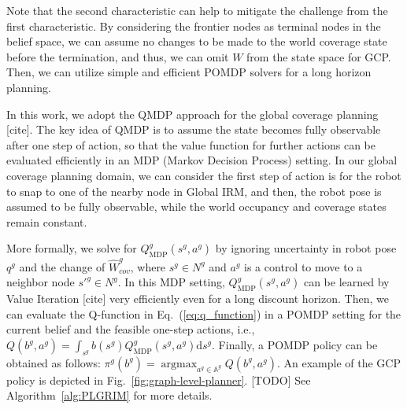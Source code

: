 \documentclass[letterpaper]{article} %
\newcommand{\phdone}[1]{} %
\newcommand{\argmax}{\mathop{\mathrm{argmax}}}
\begin{document}
%
%
\phdone{GCP Problem Approximation}
Note that the second characteristic can help to mitigate the challenge from the first characteristic.
By considering the frontier nodes as terminal nodes in the belief space, we can assume no changes to be made to the world coverage state before the termination, and thus, we can omit $W$ from the state space for GCP.
Then, we can utilize simple and efficient POMDP solvers for a long horizon planning.
%
%


\phdone{POMDP Solver for GCP}
In this work, we adopt the QMDP approach for the global coverage planning [cite].
The key idea of QMDP is to assume the state becomes fully observable after one step of action, so that the value function for further actions can be evaluated efficiently in an MDP (Markov Decision Process) setting.
In our global coverage planning domain, we can consider the first step of action is for the robot to snap to one of the nearby node in Global IRM, and then, the robot pose is assumed to be fully observable, while the world occupancy and coverage states remain constant.

%


\phdone{QMDP Details}
More formally, we solve for $Q^g_{\mathrm{MDP}}(s^g, a^g)$ by ignoring uncertainty in robot pose $q^g$ and the change of $\hat{W}^g_{cov}$, where $s^g \in N^g$ and $a^g$ is a control to move to a neighbor node $s'^g \in N^g$.
In this MDP setting, $Q^g_{\mathrm{MDP}}(s^g, a^g)$ can be learned by Value Iteration [cite] very efficiently even for a long discount horizon.
%
Then, we can evaluate the Q-function in Eq.~(\ref{eq:q_function}) in a POMDP setting for the current belief and the feasible one-step actions, i.e.,
$Q(b^g, a^g) = \int_{s^g} b(s^g) Q^g_{\mathrm{MDP}}(s^g, a^g) \mathrm{d}s^g$.
%
Finally, a POMDP policy can be obtained as follows:
$\pi^g(b^g) = \argmax_{a^g \in \mathbb{A}^g} Q(b^g, a^g)$.
%
An example of the GCP policy is depicted in Fig.~\ref{fig:graph-level-planner}.
[TODO] See Algorithm~\ref{alg:PLGRIM} for more details.
\end{document}

